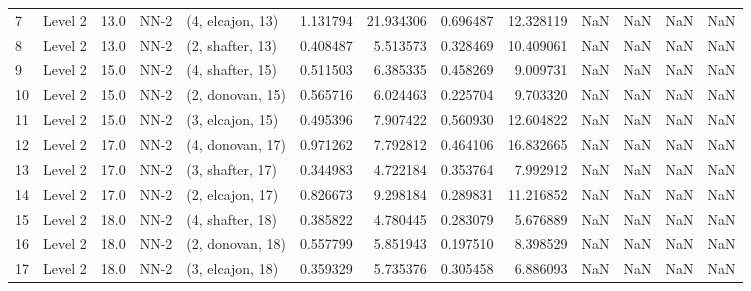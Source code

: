 \begin{tabular}{llrllrrrrrrrr}
7  &   Level 2 &   13.0 &        NN-2 &  (4, elcajon, 13) &   1.131794 &  21.934306 &  0.696487 &  12.328119 &                  NaN &                    NaN &                 NaN &                   NaN \\
8  &   Level 2 &   13.0 &        NN-2 &  (2, shafter, 13) &   0.408487 &   5.513573 &  0.328469 &  10.409061 &                  NaN &                    NaN &                 NaN &                   NaN \\
9  &   Level 2 &   15.0 &        NN-2 &  (4, shafter, 15) &   0.511503 &   6.385335 &  0.458269 &   9.009731 &                  NaN &                    NaN &                 NaN &                   NaN \\
10 &   Level 2 &   15.0 &        NN-2 &  (2, donovan, 15) &   0.565716 &   6.024463 &  0.225704 &   9.703320 &                  NaN &                    NaN &                 NaN &                   NaN \\
11 &   Level 2 &   15.0 &        NN-2 &  (3, elcajon, 15) &   0.495396 &   7.907422 &  0.560930 &  12.604822 &                  NaN &                    NaN &                 NaN &                   NaN \\
12 &   Level 2 &   17.0 &        NN-2 &  (4, donovan, 17) &   0.971262 &   7.792812 &  0.464106 &  16.832665 &                  NaN &                    NaN &                 NaN &                   NaN \\
13 &   Level 2 &   17.0 &        NN-2 &  (3, shafter, 17) &   0.344983 &   4.722184 &  0.353764 &   7.992912 &                  NaN &                    NaN &                 NaN &                   NaN \\
14 &   Level 2 &   17.0 &        NN-2 &  (2, elcajon, 17) &   0.826673 &   9.298184 &  0.289831 &  11.216852 &                  NaN &                    NaN &                 NaN &                   NaN \\
15 &   Level 2 &   18.0 &        NN-2 &  (4, shafter, 18) &   0.385822 &   4.780445 &  0.283079 &   5.676889 &                  NaN &                    NaN &                 NaN &                   NaN \\
16 &   Level 2 &   18.0 &        NN-2 &  (2, donovan, 18) &   0.557799 &   5.851943 &  0.197510 &   8.398529 &                  NaN &                    NaN &                 NaN &                   NaN \\
17 &   Level 2 &   18.0 &        NN-2 &  (3, elcajon, 18) &   0.359329 &   5.735376 &  0.305458 &   6.886093 &                  NaN &                    NaN &                 NaN &                   NaN \\

\end{tabular}
